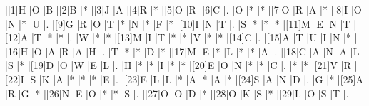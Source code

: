 
\begin{Puzzle}{12}{13}
|[1]H   |O      |B      |[2]B   |*      |[3]J   |A      |[4]R   |*      |[5]O   |R      |[6]C   |.
|O      |*      |*      |[7]O   |R      |A      |*      |[8]I   |O      |N      |*      |U      |.
|[9]G   |R      |O      |T      |*      |N      |*      |F      |*      |[10]I  |N      |T      |.
|S      |*      |*      |*      |[11]M  |E      |N      |T      |[12]A  |T      |*      |*      |.
|W      |*      |*      |[13]M  |I      |T      |*      |*      |V      |*      |*      |[14]C  |.
|[15]A  |T      |U      |I      |N      |*      |[16]H  |O      |A      |R      |A      |H      |.
|T      |*      |*      |D      |*      |[17]M  |E      |*      |L      |*      |*      |A      |.
|[18]C  |A      |N      |A      |L      |S      |*      |[19]D  |O      |W      |E      |L      |.
|H      |*      |*      |I      |*      |*      |[20]E  |O      |N      |*      |*      |C      |.
|*      |*      |[21]V  |R      |[22]I  |S      |K      |A      |*      |*      |*      |E      |.
|[23]E  |L      |L      |*      |A      |*      |A      |*      |[24]S  |A      |N      |D      |.
|G      |*      |[25]A  |R      |G      |*      |[26]N  |E      |O      |*      |*      |S      |.
|[27]O  |O      |D      |*      |[28]O  |K      |S      |*      |[29]L  |O      |S      |T      |.
\end{Puzzle}


